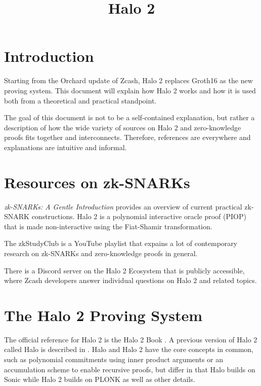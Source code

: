 \documentclass{article}
\title{Halo 2}
\date{}
\begin{document}
\maketitle

\tableofcontents

\section{Introduction}

Starting from the Orchard update of Zcash, Halo 2 replaces Groth16 as the new proving system.
This document will explain how Halo 2 works and how it is used both from a theoretical and practical standpoint.

The goal of this document is not to be a self-contained explanation, but rather a description of how the wide variety of sources on Halo 2 and zero-knowledge proofs fits together and interconnects.
Therefore, references are everywhere and explanations are intuitive and informal.

\section{Resources on zk-SNARKs} \label{sec:resources}

\textit{zk-SNARKs: A Gentle Introduction} \cite{nitulescu:zksnarks} provides an overview of current practical zk-SNARK constructions.
Halo 2 is a polynomial interactive oracle proof (PIOP) that is made non-interactive using the Fiat-Shamir transformation.

The zkStudyClub \cite{zkstudyclub} is a YouTube playlist that expains a lot of contemporary research on zk-SNARKs and zero-knowledge proofs in general.

There is a Discord server on the Halo 2 Ecosystem that is publicly accessible, where Zcash developers answer individual questions on Halo 2 and related topics.

\section{The Halo 2 Proving System}

The official reference for Halo 2 is the Halo 2 Book \cite{zcash:halo2}.
A previous version of Halo 2 called Halo is described in \cite{bowe:halo}.
Halo and Halo 2 have the core concepts in common, such as polynomial commitments using inner product arguments or an accumulation scheme to enable recursive proofs, but differ in that Halo builds on Sonic \cite{maller:sonic} while Halo 2 builds on PLONK \cite{gabizon:plonk} as well as other details.
\end{document}
